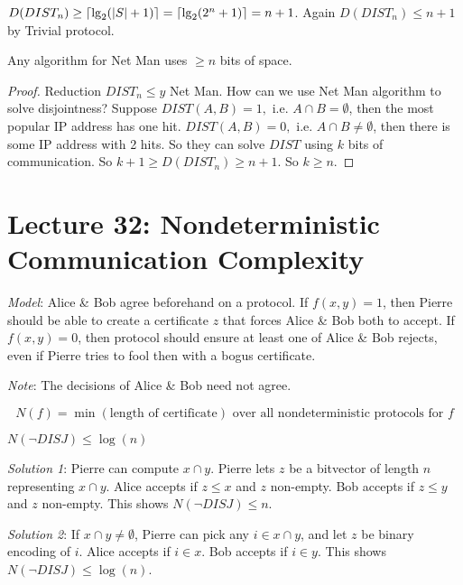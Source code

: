 \begin{corollary}
    $D(DIST_n) \geq \left \lceil \lg_2(\left | S \right | + 1) \right \rceil = \left \lceil \lg_2(2^n + 1) \right \rceil = n + 1$. Again $D(DIST_n) \leq n + 1$ by Trivial protocol.
\end{corollary}

\begin{theorem}
    Any algorithm for Net Man uses $\geq n$ bits of space.
\end{theorem}

\begin{proof}
    Reduction $DIST_n \leq y$ Net Man. How can we use Net Man algorithm to solve disjointness? Suppose $DIST(A, B) = 1, $ i.e. $A \cap B = \emptyset$, then the most popular IP address has one hit. $DIST(A, B) = 0, $ i.e. $A \cap B \neq \emptyset$, then there is some IP address with 2 hits. So they can solve $DIST$ using $k$ bits of communication. So $k + 1 \geq D(DIST_n) \geq n + 1$. So $k \geq n$.
\end{proof}

\section*{Lecture 32: Nondeterministic Communication Complexity}

\emph{Model}: Alice \& Bob agree beforehand on a protocol. If $f(x, y) = 1$, then Pierre should be able to create a certificate $z$ that forces Alice \& Bob both to accept. If $f(x, y) = 0$, then protocol should ensure at least one of Alice \& Bob rejects, even if Pierre tries to fool then with a bogus certificate.

\emph{Note}: The decisions of Alice \& Bob need not agree.

\begin{equation*}
    N(f) = \min (\text{length of certificate}) \text{ over all nondeterministic protocols for } f \tag{nondeterministic communication complexity}
\end{equation*}

\begin{example}
    $N(\neg DISJ) \leq \log(n)$

    \emph{Solution 1}: Pierre can compute $x \cap y$. Pierre lets $z$ be a bitvector of length $n$ representing $x \cap y$. Alice accepts if $z \leq x$ and $z$ non-empty. Bob accepts if $z \leq y$ and $z$ non-empty. This shows $N(\neg DISJ) \leq n$.

    \emph{Solution 2}: If $x \cap y \neq \emptyset$, Pierre can pick any $i \in x \cap y$, and let $z$ be binary encoding of $i$. Alice accepts if $i \in x$. Bob accepts if $i \in y$. This shows $N(\neg DISJ) \leq \log(n)$.
\end{example}

